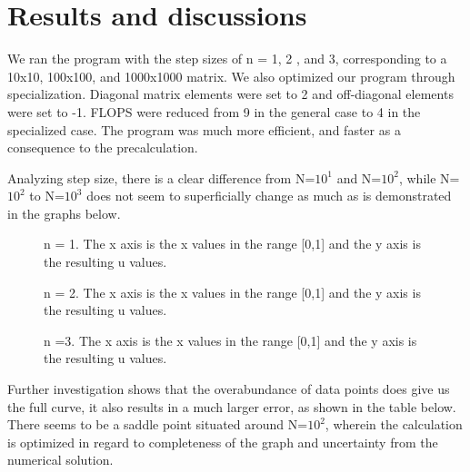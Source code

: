 \documentclass[10pt,showpacs,preprintnumbers,footinbib,amsmath,amssymb,aps,prl,twocolumn,groupedaddress,superscriptaddress,showkeys]{revtex4-1}
\begin{document}
\section{Results and discussions}

 We ran the program with the step sizes of n = 1, 2 , and 3, corresponding to a 10x10, 100x100, and 1000x1000 matrix. We also optimized our program through specialization. Diagonal matrix elements were set to 2 and off-diagonal elements were set to -1. FLOPS were reduced from 9 in the general case to 4 in the specialized case. The program was much more efficient, and faster as a consequence to the precalculation. 

 Analyzing step size, there is a clear difference from N=$10^{1}$ and N=$10^{2}$, while N=$10^{2}$ to N=$10^{3}$ does not seem to superficially change as much as is demonstrated in the graphs below.
 
\begin{figure}[!ht]
	\centering
	\label{uvx}
	\caption{ n = 1. The x axis is the x values in the range [0,1] and the y axis is the resulting u values.}
\end{figure}

\begin{figure}[!ht]
	\centering

	\label{uvx}
	\caption{n = 2. The x axis is the x values in the range [0,1] and the y axis is the resulting u values.}
\end{figure}

\begin{figure}[!ht]
	\centering

	\label{uvx}
	\caption{n =3.  The x axis is the x values in the range [0,1] and the y axis is the resulting u values.}
\end{figure}

Further investigation shows that the overabundance of data points does give us the full curve, it also results in a much larger error, as shown in the table below. There seems to be a saddle point situated around N=$10^{2}$, wherein the calculation is optimized in regard to completeness of the graph and uncertainty from the numerical solution.
\end{document}
